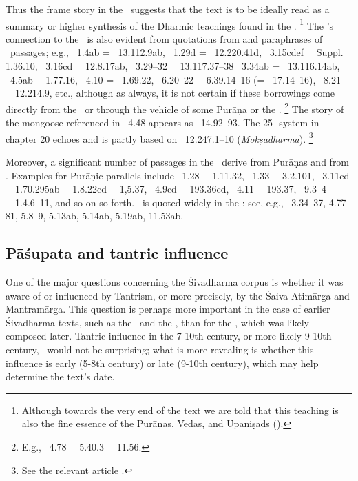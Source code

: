 \noindent
Thus the frame story in the \VSS\ suggests
that the text is to be ideally read as a summary 
or higher synthesis of the Dharmic teachings found
in the \MBh.%
        \footnote{Although towards the very end of the text
                we are told that this teaching is also the 
                fine essence of the Purāṇas, Vedas, and Upaniṣads
                ().}
The \VSS's connection to the \MBH\
is also evident from quotations from and paraphrases
of \MBH\ passages; e.g., 
\VSS\ 1.4ab = \MBH\ 13.112.9ab, 
\VSS\ 1.29d = \MBH\ 12.220.41d,
\VSS\ 3.15cdef \similar\ \MBH\ Suppl. 1.36.10,
\VSS\ 3.16cd \similar\ \MBH\ 12.8.17ab,
\VSS\ 3.29--32 \similar\ \MBH\ 13.117.37--38
\VSS\ 3.34ab = \MBH\ 13.116.14ab,
\VSS\ 4.5ab \similar\ \MBH\ 1.77.16,
\VSS\ 4.10 = \MBH\ 1.69.22, 
\VSS\ 6.20--22 \similar\ \MBH\ 6.39.14--16 (= \BHG\ 17.14--16), 
\VSS\ 8.21 \similar\ \MBH\ 12.214.9, 
etc., although as always, it is not certain if these borrowings come
directly from the \MBH\ or through the vehicle of
some Purāṇa or the \Manava.%
                \footnote{E.g., \VSS\ 4.78 \similar\ \MBH\ 5.40.3 \similar\ \Manu\ 11.56.}
The story of the mongoose referenced in \VSS\ 4.48 appears as \MBH\ 14.92--93.
The 25-\skt{tattva} system in chapter 20
echoes and is partly based on \MBH\ 12.247.1--10 (\textit{Mokṣa\-dharma}).%
        \footnote{See the relevant article .}
	
Moreover, a significant number of passages in 
the \VSS\ derive from Purāṇas and from \Manu. 
Examples for Purāṇic parallels include 
\VSS\ 1.28 \similar\ \KurmP\ 1.11.32,
\VSS\ 1.33 \similar\ \BrahmandaPur\ 3.2.101,
\VSS\ 3.11cd \similar\ \LinPu\ 1.70.295ab \similar\
                       \KurmP\ 1.8.22cd   \similar\ 
                       \LinPu\ 1,5.37, 
\VSS\ 4.9cd \similar\ \VarP\ 193.36cd,
\VSS\ 4.11 \similar\ \VarP\ 193.37,
\VSS\ 9.3--4 \similar\ \BrahmandaPur\ 1.4.6--11,
and so on so forth.
\Manu\ is quoted widely in the \VSS:
see, e.g., \VSS\ 3.34--37, 4.77--81, 5.8--9, 5.13ab, 5.14ab, 5.19ab, 11.53ab.




\subsection{Pāśupata and tantric influence}
One of the major questions concerning the Śivadharma corpus is whether it was aware of or influenced by Tantrism,
or more precisely, by the Śaiva Atimārga and Mantramārga. This question is perhaps more important in the case of earlier Śivadharma texts, such as the \SDhS\ and the \SDhU, than for the \VSS, which was likely composed later. Tantric influence in the 7-10th-century, or more likely 9-10th-century, \VSS\ would not be surprising; what is more revealing is whether this influence is early (5-8th century) or late (9-10th century), which may help determine the text's date.

